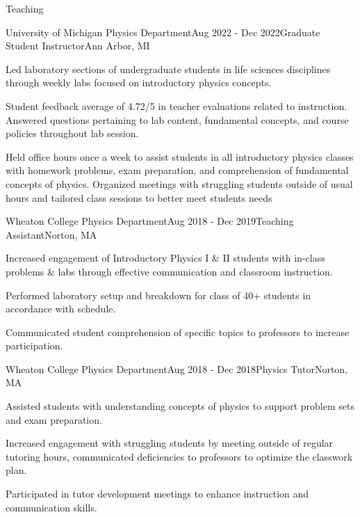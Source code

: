 \documentclass{resume} %
\begin{document}
\begin{rSection}{Teaching}

\begin{rSubsection}{University of Michigan Physics Department}{Aug 2022 - Dec 2022}{Graduate Student Instructor}{Ann Arbor, MI}
\item Led laboratory sections of undergraduate students in life sciences disciplines through weekly labs focused on introductory physics concepts. 
\item Student feedback average of 4.72/5 in teacher evaluations related to instruction. Answered questions pertaining to lab content, fundamental concepts, and course policies throughout lab session.
\item Held office hours once a week to assist students in all introductory physics classes with homework problems, exam preparation, and comprehension of fundamental concepts of physics. Organized meetings with struggling students outside of usual hours and tailored class sessions to better meet students needs

\end{rSubsection}

\begin{rSubsection}{Wheaton College Physics Department}{Aug 2018 - Dec 2019}{Teaching Assistant}{Norton, MA}
\item Increased engagement of Introductory Physics I \& II students with in-class problems \& labs through effective communication and classroom instruction.
\item Performed laboratory setup and breakdown for class of 40+ students in accordance with schedule.
\item Communicated student comprehension of specific topics to professors to increase participation.

\end{rSubsection}

\begin{rSubsection}{Wheaton College Physics Department}{Aug 2018 - Dec 2018}{Physics Tutor}{Norton, MA}
\item Assisted students with understanding concepts of physics to support problem sets and exam preparation.
\item Increased engagement with struggling students by meeting outside of regular tutoring hours, communicated deficiencies to professors to optimize the classwork plan.
\item Participated in tutor development meetings to enhance instruction and communication skills.

\end{rSubsection}

\end{rSection}
\end{document}
